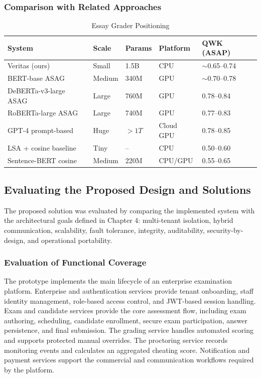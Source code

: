 \subsubsection{Comparison with Related Approaches}
\renewcommand{\arraystretch}{1.15}
\setlength{\tabcolsep}{4pt}
\begin{table}[H]
\centering
\caption{Essay Grader Positioning}
\label{tab:essay-sota-comparison}
\begin{tabular}{|p{3.4cm}|p{1.8cm}|p{2.0cm}|p{2.2cm}|p{3.6cm}|}
\hline
\textbf{System} & \textbf{Scale} & \textbf{Params} & \textbf{Platform} & \textbf{QWK (ASAP)} \\ \hline
Veritas (ours) & Small & 1.5B & CPU & $\sim$0.65--0.74 \\ \hline
BERT-base ASAG & Medium & 340M & GPU & $\sim$0.70--0.78 \\ \hline
DeBERTa-v3-large ASAG & Large & 760M & GPU & 0.78--0.84 \\ \hline
RoBERTa-large ASAG & Large & 740M & GPU & 0.77--0.83 \\ \hline
GPT-4 prompt-based & Huge & $>1T$ & Cloud GPU & 0.78--0.85 \\ \hline
LSA + cosine baseline & Tiny & -- & CPU & 0.50--0.60 \\ \hline
Sentence-BERT cosine & Medium & 220M & CPU/GPU & 0.55--0.65 \\ \hline
\end{tabular}
\end{table}

\subsection{Evaluating the Proposed Design and Solutions}
The proposed solution was evaluated by comparing the implemented system with the architectural goals defined in Chapter 4: multi-tenant isolation, hybrid communication, scalability, fault tolerance, integrity, auditability, security-by-design, and operational portability.

\subsubsection{Evaluation of Functional Coverage}
The prototype implements the main lifecycle of an enterprise examination platform. Enterprise and authentication services provide tenant onboarding, staff identity management, role-based access control, and JWT-based session handling. Exam and candidate services provide the core assessment flow, including exam authoring, scheduling, candidate enrollment, secure exam participation, answer persistence, and final submission. The grading service handles automated scoring and supports protected manual overrides. The proctoring service records monitoring events and calculates an aggregated cheating score. Notification and payment services support the commercial and communication workflows required by the platform.

